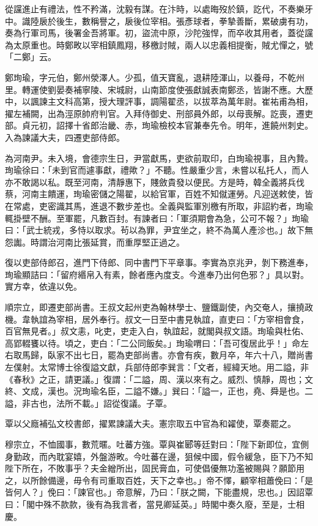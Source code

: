 \begin{pinyinscope}
 從讜進止有禮法，性不矜滿，沈毅有謀。在汴時，以處晦歿於鎮，訖代，不奏樂牙中。識陸扆於後生，數稱譽之，扆後位宰相。張彥球者，拳摯善斷，累破虜有功，奏為行軍司馬，後署金吾將軍。初，盜流中原，沙陀強悍，而卒收其用者，蓋從讜為太原重也。時鄭畋以宰相鎮鳳翔，移檄討賊，兩人以忠義相提衡，賊尤憚之，號「二鄭」云。



 鄭珣瑜，字元伯，鄭州滎澤人。少孤，值天寶亂，退耕陸渾山，以養母，不乾州里。轉運使劉晏奏補寧陵、宋城尉，山南節度使張獻誠表南鄭丞，皆謝不應。大歷中，以諷諫主文科高第，授大理評事，調陽翟丞，以拔萃為萬年尉。崔祐甫為相，擢左補闕，出為涇原帥府判官。入拜侍御史、刑部員外郎，以母喪解。訖喪，遷吏部。貞元初，詔擇十省郎治畿、赤，珣瑜檢校本官兼奉先令。明年，進饒州刺史。入為諫議大夫，四遷吏部侍郎。



 為河南尹。未入境，會德宗生日，尹當獻馬，吏欲前取印，白珣瑜視事，且內贄。珣瑜徐曰：「未到官而遽事獻，禮歟？」不聽。性嚴重少言，未嘗以私托人，而人亦不敢謁以私。既至河南，清靜惠下，賤斂貴發以便民。方是時，韓全義將兵伐蔡，河南主饋運，珣瑜密儲之陽翟，以給官軍，百姓不知僦運勞。凡迎送敕使，皆在常處，吏密識其馬，進退不數步差也。全義與監軍別檄有所取，非詔約者，珣瑜輒掛壁不酬。至軍罷，凡數百封。有諫者曰：「軍須期會為急，公可不報？」珣瑜曰：「武士統戎，多恃以取求。茍以為罪，尹宜坐之，終不為萬人產沴也。」故下無怨讟。時謂治河南比張延賞，而重厚堅正過之。



 復以吏部侍郎召，進門下侍郎、同中書門下平章事。李實為京兆尹，剝下務進奉，珣瑜顯詰曰：「留府緡帛入有素，餘者應內度支。今進奉乃出何色邪？」具以對。實方幸，依違以免。



 順宗立，即遷吏部尚書。王叔文起州吏為翰林學士、鹽鐵副使，內交奄人，攘撓政機。韋執誼為宰相，居外奉行。叔文一日至中書見執誼，直吏曰：「方宰相會食，百官無見者。」叔文恚，叱吏，吏走入白，執誼起，就閣與叔文語。珣瑜與杜佑、高郢輟饔以待。頃之，吏白：「二公同飯矣。」珣瑜喟曰：「吾可復居此乎！」命左右取馬歸，臥家不出七日，罷為吏部尚書。亦會有疾，數月卒，年六十八，贈尚書左僕射。太常博士徐復謚文獻，兵部侍郎李巽言：「文者，經緯天地。用二謚，非《春秋》之正，請更議。」復謂：「二謚，周、漢以來有之。威烈、慎靜，周也；文終、文成，漢也。況珣瑜名臣，二謚不嫌。」巽曰：「謚一，正也，堯、舜是也。二謚，非古也，法所不載。」詔從復議。子覃。



 覃以父廕補弘文校書郎，擢累諫議大夫。憲宗取五中官為和糴使，覃奏罷之。



 穆宗立，不恤國事，數荒暱。吐蕃方強。覃與崔郾等廷對曰：「陛下新即位，宜側身勤政，而內耽宴嬉，外盤游畋。今吐蕃在邊，狙候中國，假令緩急，臣下乃不知陛下所在，不敗事乎？夫金繒所出，固民膏血，可使倡優無功濫被賜與？願節用之，以所餘備邊，毋令有司重取百姓，天下之幸也。」帝不懌，顧宰相蕭俛曰：「是皆何人？」俛曰：「諫官也。」帝意解，乃曰：「朕之闕，下能盡規，忠也。」因詔覃曰：「閣中殊不款款，後有為我言者，當見卿延英。」時閣中奏久廢，至是，士相慶。




\end{pinyinscope}
